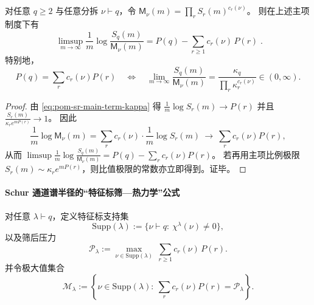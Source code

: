 \begin{theorem}\label{thm:pom-partition-resonance-ratio-test}
对任意 \(q\ge 2\) 与任意分拆 \(\nu\vdash q\)，令 \(\mathsf{M}_\nu(m)=\prod_r S_r(m)^{c_r(\nu)}\)。
则在上述主项制度下有
\[
\boxed{\;
\limsup_{m\to\infty}\frac{1}{m}\log\frac{S_q(m)}{\mathsf{M}_\nu(m)}
=P(q)-\sum_{r\ge 1}c_r(\nu)\,P(r)\; }.
\]
特别地，
\[
P(q)=\sum_{r}c_r(\nu)P(r)
\quad\Longleftrightarrow\quad
\lim_{m\to\infty}\frac{S_q(m)}{\mathsf{M}_\nu(m)}
=\frac{\kappa_q}{\prod_{r}\kappa_r^{c_r(\nu)}}\in(0,\infty).
\]
\end{theorem}
\begin{proof}
由 \eqref{eq:pom-sr-main-term-kappa} 得
\(
\frac{1}{m}\log S_r(m)\to P(r)
\)
并且
\(
\frac{S_r(m)}{\kappa_r e^{mP(r)}}\to 1
\)。
因此
\[
\frac{1}{m}\log \mathsf{M}_\nu(m)
=\sum_r c_r(\nu)\cdot \frac{1}{m}\log S_r(m)\ \longrightarrow\ \sum_r c_r(\nu)P(r),
\]
从而
\(
\limsup\frac1m\log\frac{S_q(m)}{\mathsf{M}_\nu(m)}
=P(q)-\sum_r c_r(\nu)P(r)
\)。
若再用主项比例极限 \(S_r(m)\sim \kappa_r e^{mP(r)}\)，则比值极限的常数亦立即得到。证毕。
\end{proof}

\paragraph{Schur 通道谱半径的“特征标筛—热力学”公式}
对任意 \(\lambda\vdash q\)，定义特征标支持集
\[
\mathrm{Supp}(\lambda):=\{\nu\vdash q:\ \chi^\lambda(\nu)\neq 0\},
\]
以及筛后压力
\[
\mathcal{P}_\lambda:=\max_{\nu\in\mathrm{Supp}(\lambda)}\ \sum_{r\ge 1}c_r(\nu)\,P(r).
\]
并令极大值集合
\[
\mathcal{M}_\lambda:=\left\{\nu\in\mathrm{Supp}(\lambda):\ \sum_{r}c_r(\nu)P(r)=\mathcal{P}_\lambda\right\}.
\]

